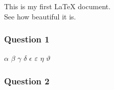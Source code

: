 This is my first LaTeX document. \\ See how beautiful it is.
\blindtext[2]	%
\subsubsection*{Question 1}
$\alpha$
$\beta$
$\gamma$
$\delta$
$\epsilon$
$\varepsilon$
$\eta$
$\vartheta$
\subsubsection*{Question 2}
